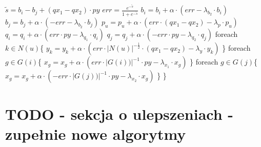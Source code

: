 \documentclass{pracamgr}
\begin{document}
     \hspace*{32pt}		$\tilde{s}=b_i-b_j+(qx_1-qx_2)\cdot py$\newline   
     \hspace*{32pt}		$err=\frac{e^{-\tilde{s}}}{1+e^{-\tilde{s}}}$\newline
     \hspace*{32pt}		$b_i=b_i+\alpha\cdot(err-\lambda_{b_2}\cdot b_i)$\newline     
     \hspace*{32pt}		$b_j=b_j+\alpha\cdot(-err-\lambda_{b_2}\cdot b_j)$\newline
     \hspace*{32pt}		$p_u=p_u+\alpha\cdot(err\cdot (qx_1-qx_2)-\lambda_p\cdot p_u)$\newline
     \hspace*{32pt}		$q_i=q_i+\alpha\cdot(err\cdot py-\lambda_{q_1}\cdot q_i)$\newline     
     \hspace*{32pt}		$q_j=q_j+\alpha\cdot(-err\cdot py-\lambda_{q_2}\cdot q_j)$\newline
     \hspace*{32pt}		foreach $k\in N(u)$\{\newline
     \hspace*{48pt}			$y_k=y_k+\alpha\cdot(err\cdot |N(u)|^{-\frac{1}{2}}\cdot(qx_1-qx_2)-\lambda_y\cdot y_k)$\newline
     \hspace*{32pt}		\}\newline    
     \hspace*{32pt}		foreach $g\in G(i)$\{\newline
     \hspace*{48pt}			$x_g=x_g+\alpha\cdot(err\cdot |G(i))|^{-1}\cdot py-\lambda_{x_1}\cdot x_g)$\newline
     \hspace*{32pt}		\}\newline
     \hspace*{32pt}		foreach $g\in G(j)$\{\newline
     \hspace*{48pt}			$x_g=x_g+\alpha\cdot(-err\cdot |G(j))|^{-1}\cdot py-\lambda_{x_2}\cdot x_g)$\newline
     \hspace*{32pt}		\}\newline
     \hspace*{16pt}	\}\newline
  \section{TODO - sekcja o ulepszeniach - zupełnie nowe algorytmy}
\end{document}
